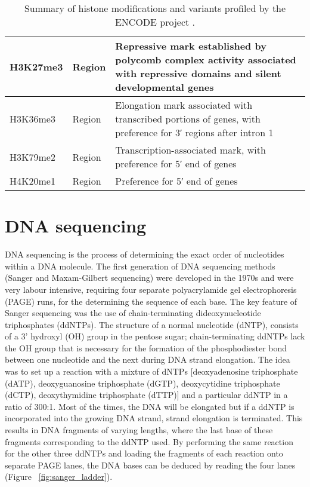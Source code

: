 \begin{table}[h]
\begin{tabular}{l l p{5cm}}
H3K27me3                        & Region                 & Repressive mark established by polycomb complex activity associated with repressive domains and silent developmental genes            \\ \hline
H3K36me3                        & Region                 & Elongation mark associated with transcribed portions of genes, with preference for 3′ regions after intron 1                          \\ \hline
H3K79me2                        & Region                 & Transcription-associated mark, with preference for 5′ end of genes                                                                    \\ \hline
H4K20me1                        & Region                 & Preference for 5′ end of genes                                                                                                       
   \end{tabular}
   \caption[Table of histone modifications]{Summary of histone modifications and variants profiled by the ENCODE project \citep{pmid22955616}.}
   \label{table:histone_mod}
\end{table}

\section{DNA sequencing}

DNA sequencing is the process of determining the exact order of nucleotides within a DNA molecule. The first generation of DNA sequencing methods (Sanger and Maxam-Gilbert sequencing) were developed in the 1970s and were very labour intensive, requiring four separate polyacrylamide gel electrophoresis (PAGE) runs, for the determining the sequence of each base. The key feature of Sanger sequencing  \citep{pmid271968} was the use of chain-terminating dideoxynucleotide triphosphates (ddNTPs). The structure of a normal nucleotide (dNTP), consists of a 3' hydroxyl (OH) group in the pentose sugar; chain-terminating ddNTPs lack the OH group that is necessary for the formation of the phosphodiester bond between one nucleotide and the next during DNA strand elongation. The idea was to set up a reaction with a mixture of dNTPs [deoxyadenosine triphosphate (dATP), deoxyguanosine triphosphate (dGTP), deoxycytidine triphosphate (dCTP), deoxythymidine triphosphate (dTTP)] and a particular ddNTP in a ratio of 300:1. Most of the times, the DNA will be elongated but if a ddNTP is incorporated into the growing DNA strand, strand elongation is terminated. This results in DNA fragments of varying lengths, where the last base of these fragments corresponding to the ddNTP used. By performing the same reaction for the other three ddNTPs and loading the fragments of each reaction onto separate PAGE lanes, the DNA bases can be deduced by reading the four lanes (Figure ~\ref{fig:sanger_ladder}).

